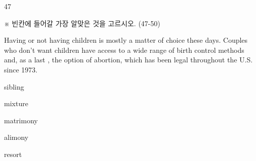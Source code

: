 \begin{question}{47}
\begin{framedtext}
※ 빈칸에 들어갈 가장 알맞은 것을 고르시오. (47-50) \par
\end{framedtext}
Having or not having children is mostly a matter of choice these days. Couples who don't want children have access to a wide range of birth control methods and, as a last \blank{}, the option of abortion, which has been legal throughout the U.S. since 1973.
\begin{choices}
  \item sibling
  \item mixture
  \item matrimony
  \item alimony
  \item resort
\end{choices}
\end{question}
